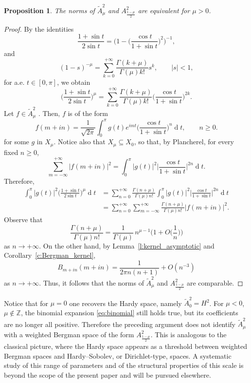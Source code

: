 \documentclass[12pt,a4paper,reqno]{amsart}
\newtheorem{prop}[thm]{Proposition}
\theoremstyle{definition}
\theoremstyle{definition}\newtheorem{defn}[thm]{Definition}
\begin{document}
    \begin{prop}
    The norms of \(\widetilde A^2_\mu\) and \(A^2_{\frac{1-\mu}{2}}\) are equivalent for $\mu>0$.
    \end{prop}
    \begin{proof}
    By the identities
    \[
    \frac{1+\sin t}{2\sin t}
    =
    \Big(
    1-\Big(\frac{\cos t}{1+\sin t}\Big)^2
    \Big)^{-1},
    \]
    and 
     \begin{equation}\label{eq:binomial}
    (1-s)^{-\mu}
    =
    \sum_{k=0}^{+\infty}
    \frac{\Gamma(k+\mu)}{\Gamma(\mu)k!}s^k,
    \qquad |s|<1,
    \end{equation}
    for a.e. $t\in[0,\pi]$, we obtain
    \begin{equation*}
    \Big(\frac{1+\sin t}{2\sin t}\Big)^\mu
    =
    \sum_{k=0}^{+\infty}
    \frac{\Gamma(k+\mu)}{\Gamma(\mu)k!}
    \Big(\frac{\cos t}{1+\sin t}\Big)^{2k}.
    \end{equation*}
    Let $f\in \widetilde A^2_\mu$
    . Then, $f$ is of the form
    \[
    f(m+in)
    =
    \frac{1}{\sqrt{2\pi}}
    \int_0^\pi
    g(t)e^{imt}
    \Big(\frac{\cos t}{1+\sin t}\Big)^n
    \operatorname{d}\!t,
    \qquad n\geqslant0.
    \]
    for some $g$ in $X_\mu$. Notice also that $X_\mu\subseteq X_0$, so that, by Plancherel, for every fixed $n\geqslant 0$, 
    \[
    \sum_{m=-\infty}^{+\infty}|f(m+in)|^2
    =
    \int_0^\pi
    |g(t)|^2
    \Big|\frac{\cos t}{1+\sin t}\Big|^{2n}
    \operatorname{d}\!t.
    \]
    Therefore,
    \begin{align*}
    \int_0^\pi
    |g(t)|^2
    \Big(\frac{1+\sin t}{2\sin t}\Big)^\mu
    \operatorname{d}\!t &=
    \sum_{n=0}^{+\infty}
    \frac{\Gamma(n+\mu)}{\Gamma(\mu)n!}
    \int_0^\pi
    |g(t)|^2
    \Big|\frac{\cos t}{1+\sin t}\Big|^{2n}
    \operatorname{d}\!t \\
    &=
    \sum_{n=0}^{+\infty}\sum_{m=-\infty}^{+\infty}
    \frac{\Gamma(n+\mu)}{\Gamma(\mu)n!}
    |f(m+in)|^2.
    \end{align*}
    Observe that 
    \[
    \frac{\Gamma(n+\mu)}{\Gamma(\mu)n!}
    =
    \frac{1}{\Gamma(\mu)}\,n^{\mu-1}
    \Big(1+O\Big(\frac{1}{n}\Big)\Big)
    \]
    as $n\to+\infty$.
    On the other hand, by Lemma~\ref{l:kernel_asymptotic} and
    Corollary~\ref{c:Bergman_kernel},
    \[
    B_{m+in}(m+in)
    =
    \frac{1}{2\pi n(n+1)}+O(n^{-3})
    \]
    as $n\to+\infty$.
    Thus, it follows that the norms of $\widetilde A^2_\mu$ and $A^2_{\frac{1-\mu}{2}}$ are comparable.
    \end{proof}
    Notice that for $\mu=0$ one recovers the Hardy space, namely $\widetilde A^2_0=H^2$. For $\mu<0$, $\mu\notin \mathbb Z$, the binomial expansion \eqref{eq:binomial} still holds true, but its coefficients are no longer all positive. Therefore the preceding argument does not identify $\widetilde A^2_\mu$ with a weighted Bergman space of the form $A^2_{\frac{1-\mu}{2}}$.
    This is analogous to the classical picture, where the Hardy space appears as a
    threshold between weighted Bergman spaces and Hardy--Sobolev, or
    Dirichlet-type, spaces. A systematic study of this range of parameters and of
    the structural properties of this scale is beyond the scope of the present
    paper and will be pursued elsewhere.
\end{document}
